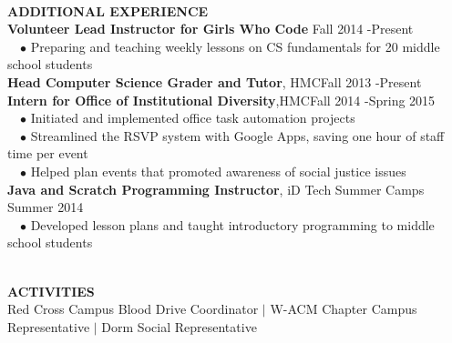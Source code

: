 \documentclass[11.5pt]{article}
\newcommand{\wrapTitle}[1]{{\sectionNL \textbf{\Large #1}} \sectionNL}
\newcommand{\vb}{ $\mid$ }
\newcommand{\sectionNL}{~\\[1pt]}
\newcommand{\customtab}{$\hspace{10pt} \bullet \hspace{2pt}$}
\newcommand{\customtabinline}{$\hspace{23pt}$}
\newcommand{\HMC}{HMC}
\newcommand{\rightAlign}{\hfill}
\begin{document}
\begin{flushleft}
\wrapTitle{ADDITIONAL EXPERIENCE}
\textbf{Volunteer Lead Instructor for Girls Who Code} \rightAlign Fall 2014 -Present \\ 
\customtab Preparing and teaching weekly lessons on CS fundamentals for 20 middle school students\\
\textbf{Head Computer Science Grader and Tutor}, \HMC \rightAlign Fall 2013 -Present \\ 
\textbf{Intern for Office of Institutional Diversity},\HMC \rightAlign Fall 2014 -Spring 2015 \\
\customtab Initiated and implemented office task automation projects\\
\customtab Streamlined the RSVP system with Google Apps, saving one hour of staff time per event  \\
\customtab Helped plan events that promoted awareness of social justice issues \\
\textbf{Java and Scratch Programming Instructor}, iD Tech Summer Camps \rightAlign Summer 2014 \\
\customtab Developed lesson plans and taught introductory programming to  middle school students\\




\end{flushleft}


\begin{flushleft}
\wrapTitle{ACTIVITIES}
\normalsize
 Red Cross Campus Blood Drive  Coordinator
 \vb W-ACM Chapter Campus Representative
 \vb Dorm Social Representative
\end{flushleft}


	
\end{document}
